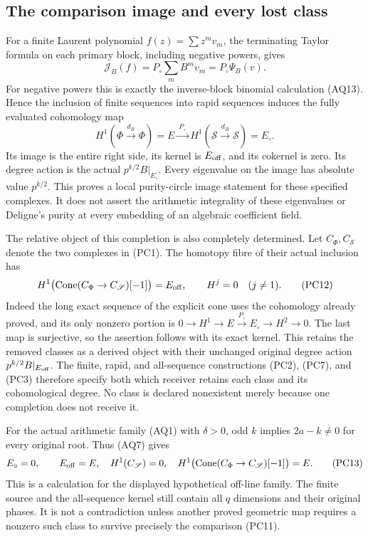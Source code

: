 \subsection{The comparison image and every lost class}
For a finite Laurent polynomial $f(z)=\sum z^mv_m$, the terminating
Taylor formula on each primary block, including negative powers,
gives
\[
 \mathcal J_B(f)=P_\circ\sum_mB^mv_m=P_\circ\Psi_B(v).
 \tag{PC10}
\]
For negative powers this is exactly the inverse-block binomial
calculation (AQ13). Hence the inclusion of finite sequences into
rapid sequences induces the fully evaluated cohomology map
\[
 \boxed{H^1(\Phi\xrightarrow{d_B}\Phi)=E
       \xrightarrow{\ P_\circ\ }
       H^1(\mathscr S\xrightarrow{d_B}\mathscr S)=E_\circ.}
 \tag{PC11}
\]
Its image is the entire right side, its kernel is $E_{\rm off}$, and
its cokernel is zero. Its degree action is the actual
$p^{k/2}B|_{E_\circ}$. Every eigenvalue on the image has absolute
value $p^{k/2}$. This proves a local purity-circle image statement for
these specified complexes. It does not assert the arithmetic
integrality of these eigenvalues or Deligne's purity at every
embedding of an algebraic coefficient field.

The relative object of this completion is also completely determined.
Let $C_\Phi,C_{\mathscr S}$ denote the two complexes in (PC1).
The homotopy fibre of their actual inclusion has
\[
 H^1\bigl(\operatorname{Cone}(C_\Phi\to C_{\mathscr S})[-1]\bigr)
       =E_{\rm off},\qquad H^j=0\quad(j\ne1).
 \tag{PC12}
\]
Indeed the long exact sequence of the explicit cone uses the
cohomology already proved, and its only nonzero portion is
$0\to H^1\to E\xrightarrow{P_\circ}E_\circ\to H^2\to0$.
The last map is surjective, so the assertion follows with its exact
kernel. This retains the removed classes as a derived object with
their unchanged original degree action $p^{k/2}B|_{E_{\rm off}}$.
The finite, rapid, and all-sequence constructions (PC2), (PC7), and
(PC3) therefore specify both which receiver retains each class and
its cohomological degree. No class is declared nonexistent merely
because one completion does not receive it.

For the actual arithmetic family (AQ1) with $\delta>0$, odd $k$
implies $2a-k\ne0$ for every original root. Thus (AQ7) gives
\[
 E_\circ=0,\qquad E_{\rm off}=E,
 \quad H^1(C_{\mathscr S})=0,
 \quad H^1\bigl(\operatorname{Cone}(C_\Phi\to C_{\mathscr S})[-1]\bigr)=E.
 \tag{PC13}
\]
This is a calculation for the displayed hypothetical off-line family.
The finite source and the all-sequence kernel still contain all $q$
dimensions and their original phases. It is not a contradiction
unless another proved geometric map requires a nonzero such class to
survive precisely the comparison (PC11).

